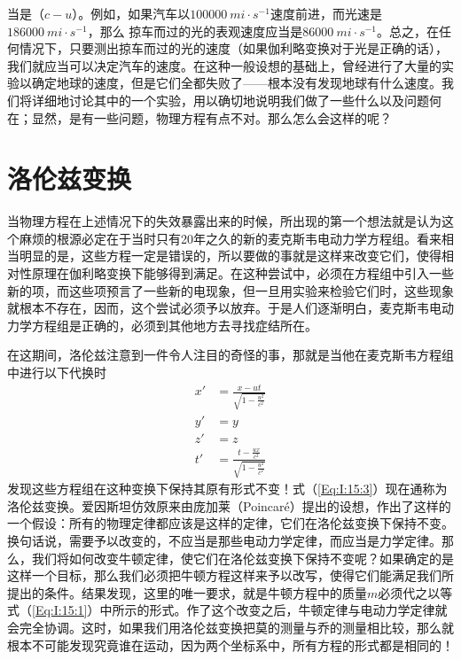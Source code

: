 当是（$c-u$）。例如，如果汽车以$100000~mi \cdot s^{-1}$速度前进，而光速是$186000~mi \cdot s^{-1}$，那么
掠车而过的光的表观速度应当是$86000~mi \cdot s^{-1}$。总之，在任何情况下，只要测出掠车而过的光的速度（如果伽利略变换对于光是正确的话），我们就应当可以决定汽车的速度。在这种一般设想的基础上，曾经进行了大量的实验以确定地球的速度，但是它们全都失败了——根本没有发现地球有什么速度。我们将详细地讨论其中的一个实验，用以确切地说明我们做了一些什么以及问题何在；显然，是有一些问题，物理方程有点不对。那么怎么会这样的呢？

\section{洛伦兹变换}

当物理方程在上述情况下的失效暴露出来的时候，所出现的第一个想法就是认为这个麻烦的根源必定在于当时只有20年之久的新的麦克斯韦电动力学方程组。看来相当明显的是，这些方程一定是错误的，所以要做的事就是这样来改变它们，使得相对性原理在伽利略变换下能够得到满足。在这种尝试中，必须在方程组中引入一些新的项，而这些项预言了一些新的电现象，但一旦用实验来检验它们时，这些现象就根本不存在，因而，这个尝试必须予以放弃。于是人们逐渐明白，麦克斯韦电动力学方程组是正确的，必须到其他地方去寻找症结所在。

在这期间，洛伦兹注意到一件令人注目的奇怪的事，那就是当他在麦克斯韦方程组中进行以下代换时
\begin{equation}
    \label{Eq:I:15:3}
    \begin{aligned}
        x'&=\frac{x-ut}{\sqrt{1-\frac{u^2}{c^2}}} \\
        y'&=y \\
        z'&=z \\
        t'&=\frac{t-\frac{ux}{c^2}}{\sqrt{1-\frac{u^2}{c^2}}}
    \end{aligned}
\end{equation}
发现这些方程组在这种变换下保持其原有形式不变！式（\ref{Eq:I:15:3}）现在通称为洛伦兹变换。爱因斯坦仿效原来由庞加莱（Poincaré）提出的设想，作出了这样的一个假设：所有的物理定律都应该是这样的定律，它们在洛伦兹变换下保持不变。换句话说，需要予以改变的，不应当是那些电动力学定律，而应当是力学定律。那么，我们将如何改变牛顿定律，使它们在洛伦兹变换下保持不变呢？如果确定的是这样一个目标，那么我们必须把牛顿方程这样来予以改写，使得它们能满足我们所提出的条件。结果发现，这里的唯一要求，就是牛顿方程中的质量$m$必须代之以等式（\ref{Eq:I:15:1}）中所示的形式。作了这个改变之后，牛顿定律与电动力学定律就会完全协调。这时，如果我们用洛伦兹变换把莫的测量与乔的测量相比较，那么就根本不可能发现究竟谁在运动，因为两个坐标系中，所有方程的形式都是相同的！

